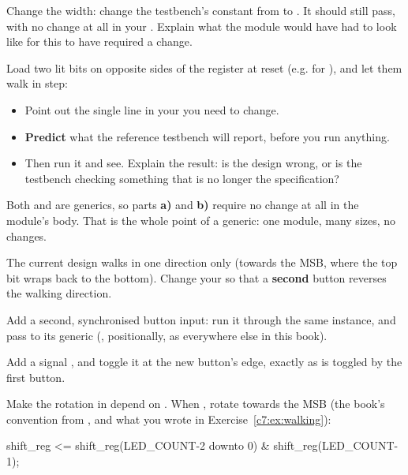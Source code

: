  Change the width: change the testbench's constant  from  to
. It should still pass, with no change at all in your . Explain what
the module would have had to look like for this to have required a change.

 Load two lit bits on opposite sides of the register at reset (e.g.  for
), and let them walk in step:
\begin{itemize}
  \item Point out the single line in your  you need to change.
  \item \textbf{Predict} what the reference testbench will report, before you run anything.
  \item Then run it and see. Explain the result: is the design wrong, or is the testbench checking
    something that is no longer the specification?
\end{itemize}

\note[Hint]Both  and  are generics, so parts \textbf{a)} and
\textbf{b)} require no change at all in the module's body. That is the whole point of a generic: one
module, many sizes, no changes.

\label{c7:ex:direction}
The current design walks in one direction only (towards the MSB, where the top bit wraps back to the
bottom). Change your  so that a \textbf{second} button reverses the walking
direction.

 Add a second, synchronised button input: run it through the same 
instance, and pass  to its generic  (, positionally, as
everywhere else in this book).

 Add a signal , and toggle it at the new button's edge, exactly as
 is toggled by the first button.

 Make the rotation in  depend on . When
, rotate towards the MSB (the book's convention from ,
and what you wrote in Exercise~\ref{c7:ex:walking}):

\begin{vhdlcode}
shift_reg <= shift_reg(LED_COUNT-2 downto 0) & shift_reg(LED_COUNT-1);
\end{vhdlcode}


